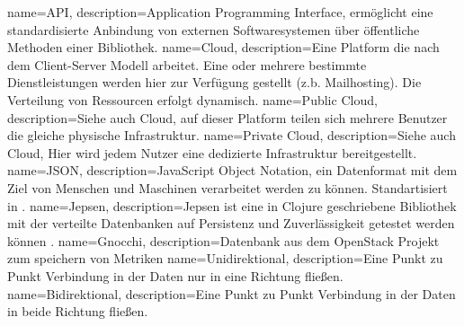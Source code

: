 {
  name=API,
  description={Application Programming Interface, ermöglicht eine
               standardisierte Anbindung von externen Softwaresystemen über
               öffentliche Methoden einer Bibliothek.\cite{HowDoAPIsEvolve}}
}
{
  name=Cloud,
  description={Eine Platform die nach dem Client-Server Modell arbeitet. Eine
               oder mehrere bestimmte Dienstleistungen werden hier zur
               Verfügung gestellt (z.b. Mailhosting). Die Verteilung von
               Ressourcen erfolgt dynamisch.}
}
{
  name=Public Cloud,
  description={Siehe auch \gls{Cloud}, auf dieser Platform teilen sich mehrere
               Benutzer die gleiche physische Infrastruktur.}
}
{
  name=Private Cloud,
  description={Siehe auch \gls{Cloud}, Hier wird jedem Nutzer eine dedizierte
               Infrastruktur bereitgestellt.}
}
{
  name=JSON,
  description={JavaScript Object Notation, ein Datenformat mit dem Ziel von
               Menschen und Maschinen verarbeitet werden zu können.
               Standartisiert in \cite{RFC7159}.}
}
{
  name=Jepsen,
  description={Jepsen ist eine in Clojure geschriebene Bibliothek mit der
               verteilte Datenbanken auf Persistenz und Zuverlässigkeit
               getestet werden können \cite{Jepsen_Introduction}.}
}
{
  name=Gnocchi,
  description={Datenbank aus dem OpenStack Projekt zum speichern von Metriken}
}
{
  name=Unidirektional,
  description={Eine Punkt zu Punkt Verbindung in der Daten nur in eine Richtung
               fließen.}
}
{
  name=Bidirektional,
  description={Eine Punkt zu Punkt Verbindung in der Daten in beide Richtung
               fließen.}
}

